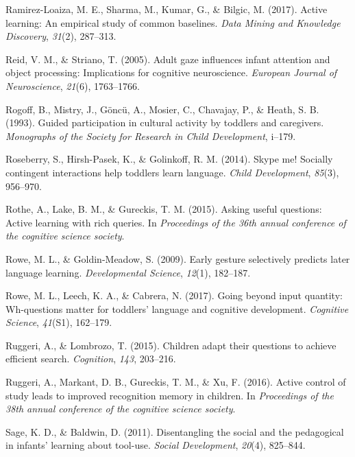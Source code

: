 \documentclass[english,floatsintext,man]{apa6}
\theoremstyle{definition}
\theoremstyle{definition}
\theoremstyle{definition}
\theoremstyle{remark}
\begin{document}
\hypertarget{ref-ramirez2017active}{}
Ramirez-Loaiza, M. E., Sharma, M., Kumar, G., \& Bilgic, M. (2017).
Active learning: An empirical study of common baselines. \emph{Data
Mining and Knowledge Discovery}, \emph{31}(2), 287--313.

\hypertarget{ref-reid2005adult}{}
Reid, V. M., \& Striano, T. (2005). Adult gaze influences infant
attention and object processing: Implications for cognitive
neuroscience. \emph{European Journal of Neuroscience}, \emph{21}(6),
1763--1766.

\hypertarget{ref-rogoff1993guided}{}
Rogoff, B., Mistry, J., Göncü, A., Mosier, C., Chavajay, P., \& Heath,
S. B. (1993). Guided participation in cultural activity by toddlers and
caregivers. \emph{Monographs of the Society for Research in Child
Development}, i--179.

\hypertarget{ref-roseberry2014skype}{}
Roseberry, S., Hirsh-Pasek, K., \& Golinkoff, R. M. (2014). Skype me!
Socially contingent interactions help toddlers learn language.
\emph{Child Development}, \emph{85}(3), 956--970.

\hypertarget{ref-rothe2015asking}{}
Rothe, A., Lake, B. M., \& Gureckis, T. M. (2015). Asking useful
questions: Active learning with rich queries. In \emph{Proceedings of
the 36th annual conference of the cognitive science society}.

\hypertarget{ref-rowe2009early}{}
Rowe, M. L., \& Goldin-Meadow, S. (2009). Early gesture selectively
predicts later language learning. \emph{Developmental Science},
\emph{12}(1), 182--187.

\hypertarget{ref-rowe2017going}{}
Rowe, M. L., Leech, K. A., \& Cabrera, N. (2017). Going beyond input
quantity: Wh-questions matter for toddlers' language and cognitive
development. \emph{Cognitive Science}, \emph{41}(S1), 162--179.

\hypertarget{ref-ruggeri2015children}{}
Ruggeri, A., \& Lombrozo, T. (2015). Children adapt their questions to
achieve efficient search. \emph{Cognition}, \emph{143}, 203--216.

\hypertarget{ref-ruggeri2016active}{}
Ruggeri, A., Markant, D. B., Gureckis, T. M., \& Xu, F. (2016). Active
control of study leads to improved recognition memory in children. In
\emph{Proceedings of the 38th annual conference of the cognitive science
society}.

\hypertarget{ref-sage2011disentangling}{}
Sage, K. D., \& Baldwin, D. (2011). Disentangling the social and the
pedagogical in infants' learning about tool-use. \emph{Social
Development}, \emph{20}(4), 825--844.
\end{document}
